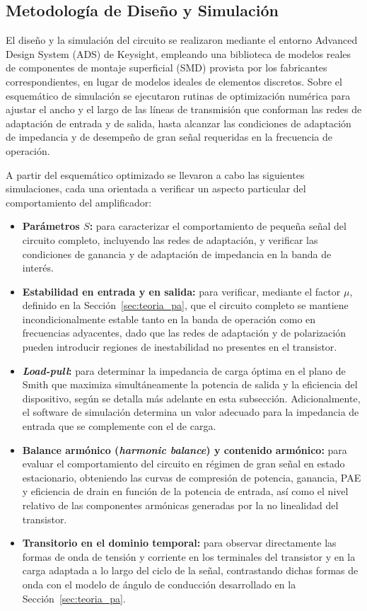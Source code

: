 \subsection{Metodología de Diseño y Simulación}
El diseño y la simulación del circuito se realizaron mediante el entorno Advanced Design System (ADS) de Keysight, empleando una biblioteca de modelos reales de componentes de montaje superficial (SMD) provista por los fabricantes correspondientes, en lugar de modelos ideales de elementos discretos. Sobre el esquemático de simulación se ejecutaron rutinas de optimización numérica para ajustar el ancho y el largo de las líneas de transmisión que conforman las redes de adaptación de entrada y de salida, hasta alcanzar las condiciones de adaptación de impedancia y de desempeño de gran señal requeridas en la frecuencia de operación.

A partir del esquemático optimizado se llevaron a cabo las siguientes simulaciones, cada una orientada a verificar un aspecto particular del comportamiento del amplificador:

\begin{itemize}
    \item \textbf{Parámetros $S$:} para caracterizar el comportamiento de pequeña señal del circuito completo, incluyendo las redes de adaptación, y verificar las condiciones de ganancia y de adaptación de impedancia en la banda de interés.
    \item \textbf{Estabilidad en entrada y en salida:} para verificar, mediante el factor $\mu$, definido en la Sección~\ref{sec:teoria_pa}, que el circuito completo se mantiene incondicionalmente estable tanto en la banda de operación como en frecuencias adyacentes, dado que las redes de adaptación y de polarización pueden introducir regiones de inestabilidad no presentes en el transistor.
    \item \textbf{\textit{Load-pull}:} para determinar la impedancia de carga óptima en el plano de Smith que maximiza simultáneamente la potencia de salida y la eficiencia del dispositivo, según se detalla más adelante en esta subsección. Adicionalmente, el software de simulación determina un valor adecuado para la impedancia de entrada que se complemente con el de carga.
    \item \textbf{Balance armónico (\textit{harmonic balance}) y contenido armónico:} para evaluar el comportamiento del circuito en régimen de gran señal en estado estacionario, obteniendo las curvas de compresión de potencia, ganancia, PAE y eficiencia de drain en función de la potencia de entrada, así como el nivel relativo de las componentes armónicas generadas por la no linealidad del transistor.
    \item \textbf{Transitorio en el dominio temporal:} para observar directamente las formas de onda de tensión y corriente en los terminales del transistor y en la carga adaptada a lo largo del ciclo de la señal, contrastando dichas formas de onda con el modelo de ángulo de conducción desarrollado en la Sección~\ref{sec:teoria_pa}.
\end{itemize}

